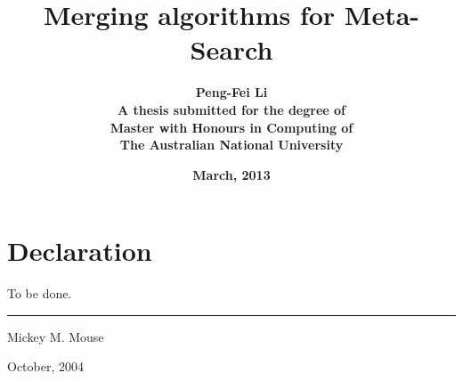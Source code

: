 \documentclass[twoside,onecolumn,11pt,a4paper]{book}
\begin{document}

\begin{titlepage}
\title{\textbf{Merging algorithms for Meta-Search}\\[2cm]}
 \author{\textbf{Peng-Fei Li}\\[6cm]
 \textbf{A thesis submitted for the degree of}\\
 \textbf{Master with Honours in Computing of} \\
 \textbf{The Australian National University}\\[1cm]}
 \date{\textbf{March, 2013}}
\maketitle
 \end{titlepage}
 
 \sloppy
 
\chapter*{Declaration}

To be done.
\cite{Bergman2001}

\vspace{20mm}  %

\hspace{80mm}\rule{40mm}{.15mm}\par   %
\hspace{80mm} Mickey M. Mouse\par
\hspace{80mm} October, 2004




\tableofcontents
\listoffigures %

\setcounter{page}{1}  %





\end{document}
